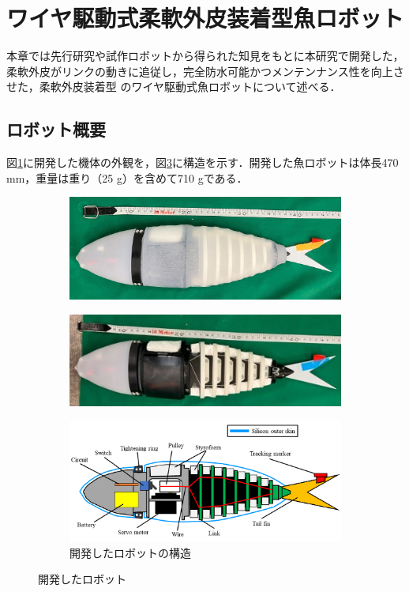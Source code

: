 \newpage

\section{ワイヤ駆動式柔軟外皮装着型魚ロボット}
本章では先行研究\cite{kyu}や試作ロボットから得られた知見をもとに本研究で開発した，柔軟外皮がリンクの動きに追従し，完全防水可能かつメンテンナンス性を向上させた，柔軟外皮装着型
のワイヤ駆動式魚ロボットについて述べる．
\subsection{ロボット概要}
図\ref{fig:fishrobo_with}に開発した機体の外観を，図\ref{fig:kouzou}に構造を示す．開発した魚ロボットは体長470 mm，重量は重り（25 g）を含めて710 gである．
\begin{figure}[htbp]
    \centering  
    \begin{subfigure}[b]{0.85\linewidth}
        \centering
        \includegraphics[width=0.9\linewidth]{chapters/picture/withskin.jpg}
        \label{fig:fishrobo_with}
    \end{subfigure}
    \begin{subfigure}[b]{0.85\linewidth}
        \centering
        \includegraphics[width=0.9\linewidth]{chapters/picture/without_skin.jpg}
        \label{fig:fishrobo_less}
    \end{subfigure}
    \begin{subfigure}[b]{0.85\linewidth}
        \centering
        \includegraphics[width=0.9\linewidth]{chapters/picture/fish.png}
        \caption{開発したロボットの構造}
        \label{fig:kouzou}
    \end{subfigure}
    \caption{開発したロボット}
    \label{fig:gaikan}
\end{figure}
